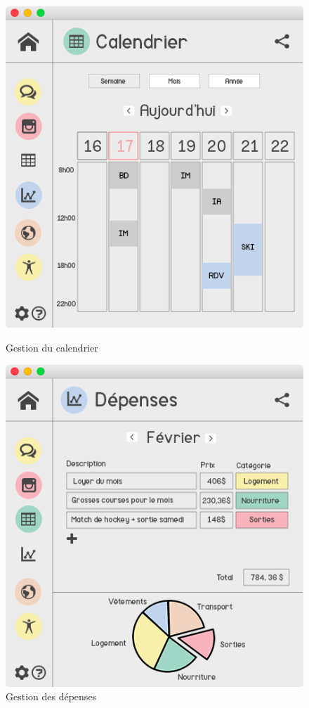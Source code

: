 \documentclass[11pt]{article}
\begin{document}
\begin{figure}[hbtp]
    \begin{minipage}[b]{0.4\linewidth}
        \centering \includegraphics[scale=0.43]{Modelisation/calendrier2.png}
        \caption{Gestion du calendrier}
                \label{fig:calendrier2}
\label{fig:base}
    \end{minipage}\hfill
    \begin{minipage}[b]{0.48\linewidth}
        \centering \includegraphics[scale=0.43]{Modelisation/depenses.png}
        \caption{Gestion des dépenses}
         \label{fig:depenses}
    \end{minipage}
\end{figure}
\end{document}
